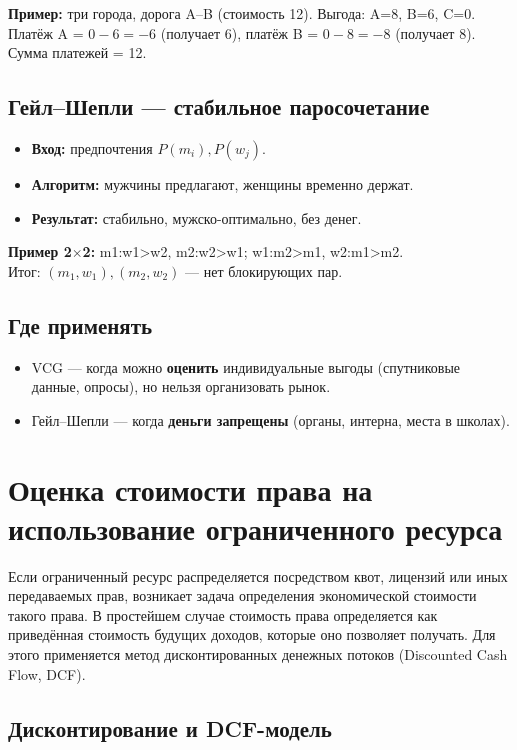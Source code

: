 \documentclass[12pt]{article}
\begin{document}
\textbf{Пример:} три города, дорога A--B (стоимость 12). Выгода: A=8, B=6, C=0.
Платёж A = $0-6=-6$ (получает 6), платёж B = $0-8=-8$ (получает 8). Сумма платежей = 12.

\subsection{Гейл--Шепли — стабильное паросочетание}
\begin{itemize}
\item \textbf{Вход:} предпочтения $P(m_i), P(w_j)$.
\item \textbf{Алгоритм:} мужчины предлагают, женщины временно держат.
\item \textbf{Результат:} стабильно, мужско-оптимально, без денег.
\end{itemize}

\textbf{Пример 2$\times$2:} m1:w1>w2, m2:w2>w1; w1:m2>m1, w2:m1>m2. \\
Итог: $(m_1,w_1),(m_2,w_2)$ — нет блокирующих пар.

\subsection{Где применять}
\begin{itemize}
\item VCG — когда можно \textbf{оценить} индивидуальные выгоды (спутниковые данные, опросы), но нельзя организовать рынок.
\item Гейл--Шепли — когда \textbf{деньги запрещены} (органы, интерна, места в школах).
\end{itemize}

\section{Оценка стоимости права на использование ограниченного ресурса}

Если ограниченный ресурс распределяется посредством квот, лицензий или иных передаваемых прав, возникает задача определения экономической стоимости такого права. В простейшем случае стоимость права определяется как приведённая стоимость будущих доходов, которые оно позволяет получать. Для этого применяется метод дисконтированных денежных потоков (Discounted Cash Flow, DCF).

\subsection{Дисконтирование и DCF-модель}
\end{document}
